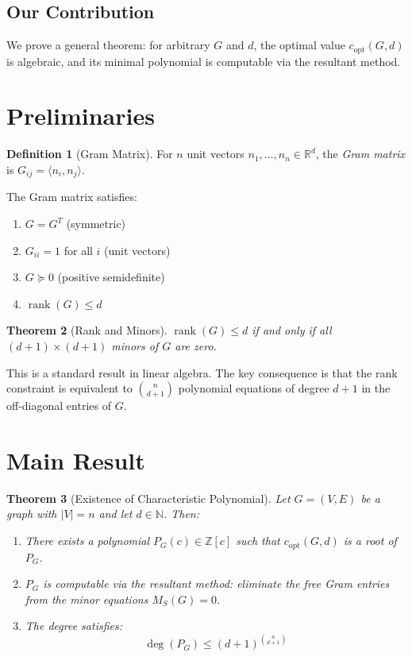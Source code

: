\documentclass[11pt]{article}
\newtheorem{theorem}{Theorem}[section]
\theoremstyle{definition}
\newtheorem{definition}[theorem]{Definition}
\begin{document}
\subsection{Our Contribution}

We prove a general theorem: for arbitrary $G$ and $d$, the optimal value
$c_{\mathrm{opt}}(G,d)$ is algebraic, and its minimal polynomial is computable
via the resultant method.

\section{Preliminaries}

\begin{definition}[Gram Matrix]
For $n$ unit vectors $n_1, \ldots, n_n \in \mathbb{R}^d$, the \emph{Gram matrix}
is $G_{ij} = \langle n_i, n_j \rangle$.
\end{definition}

The Gram matrix satisfies:
\begin{enumerate}[label=(\roman*)]
    \item $G = G^T$ (symmetric)
    \item $G_{ii} = 1$ for all $i$ (unit vectors)
    \item $G \succeq 0$ (positive semidefinite)
    \item $\operatorname{rank}(G) \le d$
\end{enumerate}

\begin{theorem}[Rank and Minors]\label{thm:rank}
$\operatorname{rank}(G) \le d$ if and only if all $(d+1) \times (d+1)$ minors
of $G$ are zero.
\end{theorem}

This is a standard result in linear algebra. The key consequence is that
the rank constraint is equivalent to $\binom{n}{d+1}$ polynomial equations
of degree $d+1$ in the off-diagonal entries of $G$.

\section{Main Result}

\begin{theorem}[Existence of Characteristic Polynomial]\label{thm:main}
Let $G = (V,E)$ be a graph with $|V| = n$ and let $d \in \mathbb{N}$.
Then:
\begin{enumerate}
    \item There exists a polynomial $P_G(c) \in \mathbb{Z}[c]$ such that
    $c_{\mathrm{opt}}(G,d)$ is a root of $P_G$.
    \item $P_G$ is computable via the resultant method: eliminate the free
    Gram entries from the minor equations $M_S(G) = 0$.
    \item The degree satisfies:
    \begin{equation}\label{eq:bound}
    \deg(P_G) \le (d+1)^{\binom{n}{d+1}}
    \end{equation}
\end{enumerate}
\end{theorem}
\end{document}
